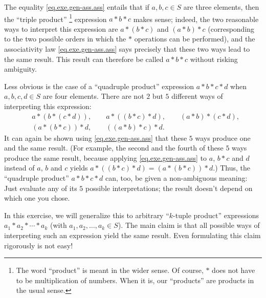 \documentclass[paper=a4, fontsize=12pt]{scrartcl} %
\newcommand{\tup}[1]{\left( #1 \right)}
\theoremstyle{plainsl}
\theoremstyle{definition}
\theoremstyle{remark}
\begin{document}
The equality \eqref{eq.exe.gen-ass.ass} entails that if
$a, b, c \in S$ are three elements, then the ``triple product''%
\footnote{The word ``product'' is meant in the wider sense.
Of course, $*$ does not have to be multiplication of numbers.
When it is, our ``products'' are products in the usual sense.}
expression $a * b * c$ makes sense; indeed, the two reasonable
ways to interpret this expression are $a * \tup{b * c}$ and
$\tup{a * b} * c$ (corresponding to the two possible orders in
which the $*$ operations can be performed), and the associativity
law \eqref{eq.exe.gen-ass.ass} says precisely that these two
ways lead to the same result.
This result can therefore be called
$a * b * c$ without risking ambiguity.

Less obvious is the case of a ``quadruple product'' expression
$a * b * c * d$ when $a, b, c, d \in S$ are four elements.
There are not $2$ but $5$ different ways of interpreting this
expression:
\begin{align*}
&
a * \tup{b * \tup{c * d}}, \qquad
a * \tup{\tup{b * c} * d}, \qquad
\tup{a * b} * \tup{c * d}, \\
&
\tup{a * \tup{b * c}} * d, \qquad
\tup{\tup{a * b} * c} * d.
\end{align*}
It can again be shown using \eqref{eq.exe.gen-ass.ass} that
these $5$ ways produce one and the same result.
(For example, the second and the fourth of these $5$ ways
produce the same result, because applying
\eqref{eq.exe.gen-ass.ass} to $a$, $b * c$ and $d$ instead
of $a$, $b$ and $c$ yields
$a * \tup{\tup{b * c} * d} = \tup{a * \tup{b * c}} * d$.)
Thus, the ``quadruple product'' $a * b * c * d$ can, too,
be given a non-ambiguous meaning:
Just evaluate any of its $5$ possible interpretations;
the result doesn't depend on which one you chose.

In this exercise, we will generalize this to arbitrary
``$k$-tuple product'' expressions $a_1 * a_2 * \cdots * a_k$
(with $a_1, a_2, \ldots, a_k \in S$).
The main claim is that all possible ways of interpreting
such an expression yield the same result.
Even formulating this claim rigorously is not easy!
\end{document}
